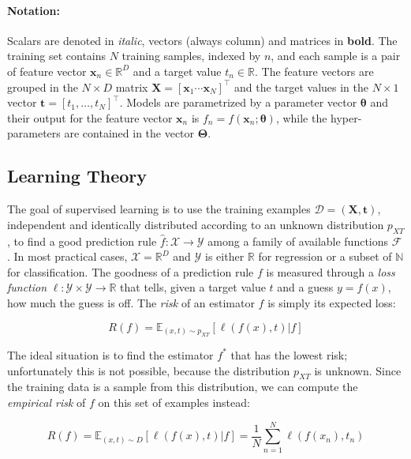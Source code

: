 \documentclass[a4paper,11pt]{kth-mag}
\begin{document}
\paragraph{Notation:} Scalars are denoted in \textit{italic}, vectors (always column) and matrices in \textbf{bold}. The training set contains $N$ training samples, indexed by $n$, and each sample is a pair of feature vector $\bm x_n\in\mathbb{R}^D$ and a target value $t_n\in\mathbb{R}$. The feature vectors are grouped in the $N\times D$ matrix $\bm X=\left[\bm x_1\dotsb\bm x_N\right]^\intercal$ and the target values in the $N\times 1$ vector $\bm t=\left[t_1,\ldots,t_N\right]^\intercal$. Models are parametrized by a parameter vector $\bm\theta$ and their output for the feature vector $\bm x_n$ is $f_n=f(\bm x_n;\bm\theta)$, while the hyper-parameters are contained in the vector $\bm\Theta$.

\subsection{Learning Theory}
\label{sec:learning_theory}
The goal of supervised learning is to use the training examples $\mathcal{D}=(\bm X, \bm t)$, independent and identically distributed according to an unknown distribution $p_{XT}$, to find a good prediction rule $\hat{f}:\mathcal{X}\rightarrow\mathcal{Y}$ among a family of available functions $\mathcal{F}$. In most practical cases, $\mathcal{X}=\mathbb{R}^D$ and $\mathcal{Y}$ is either $\mathbb{R}$ for regression or a subset of $\mathbb{N}$ for classification. The goodness of a prediction rule $f$ is measured through a \emph{loss function} $\ell:\mathcal{Y}\times\mathcal{Y}\rightarrow\mathbb{R}$ that tells, given a target value $t$ and a guess $y=f(x)$, how much the guess is off. The \emph{risk} of an estimator $f$ is simply its expected loss:

\begin{equation}
R(f)=\mathbb{E}_{(x,t)\sim p_{XT}}\left[\ell(f(x),t) \vert f \right]
\end{equation}

The ideal situation is to find the estimator $f^*$ that has the lowest risk; unfortunately this is not possible, because the distribution $p_{XT}$ is unknown. Since the training data is a sample from this distribution, we can compute the \emph{empirical risk} of $f$ on this set of examples instead:

\begin{equation}
\hat{R}(f)=\mathbb{E}_{(x,t)\sim D}\left[\ell(f(x),t)\vert f\right]=\frac{1}{N}\sum_{n=1}^N \ell(f(x_n),t_n)
\end{equation}
\end{document}
